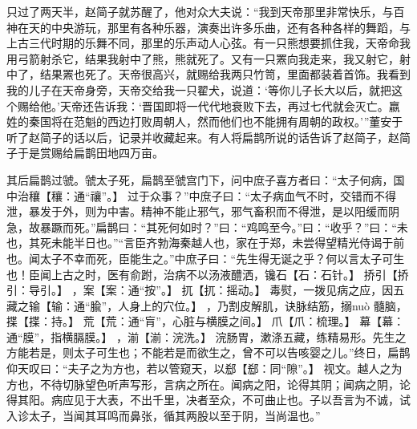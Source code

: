 \documentclass[12pt,UTF8]{ctexbook}
\begin{document}
只过了两天半，赵简子就苏醒了，他对众大夫说：“我到天帝那里非常快乐，与百神在天的中央游玩，那里有各种乐器，演奏出许多乐曲，还有各种各样的舞蹈，与上古三代时期的乐舞不同，那里的乐声动人心弦。有一只熊想要抓住我，天帝命我用弓箭射杀它，结果我射中了熊，熊就死了。又有一只罴向我走来，我又射它，射中了，结果罴也死了。天帝很高兴，就赐给我两只竹笥，里面都装着首饰。我看到我的儿子在天帝身旁，天帝交给我一只翟犬，说道：‘等你儿子长大以后，就把这个赐给他。’天帝还告诉我：‘晋国即将一代代地衰败下去，再过七代就会灭亡。嬴姓的秦国将在范魁的西边打败周朝人，然而他们也不能拥有周朝的政权。’”董安于听了赵简子的话以后，记录并收藏起来。有人将扁鹊所说的话告诉了赵简子，赵简子于是赏赐给扁鹊田地四万亩。

其后扁鹊过虢。虢太子死，扁鹊至虢宫门下，问中庶子喜方者曰：“太子何病，国中治穰【穰：通“禳”。】 过于众事？”中庶子曰：“太子病血气不时，交错而不得泄，暴发于外，则为中害。精神不能止邪气，邪气畜积而不得泄，是以阳缓而阴急，故暴蹶而死。”扁鹊曰：“其死何如时？”曰：“鸡鸣至今。”曰：“收乎？”曰：“未也，其死未能半日也。”“言臣齐勃海秦越人也，家在于郑，未尝得望精光侍谒于前也。闻太子不幸而死，臣能生之。”中庶子曰：“先生得无诞之乎？何以言太子可生也！臣闻上古之时，医有俞跗，治病不以汤液醴洒，镵石【石：石针。】 挢引【挢引：导引。】 ，案【案：通“按”。】 扤【扤：摇动。】 毒熨，一拨见病之应，因五藏之输【输：通“腧”，人身上的穴位。】 ，乃割皮解肌，诀脉结筋，搦nuò 髓脑，揲【揲：持。】 荒【荒：通“肓”，心脏与横膜之间。】 爪【爪：梳理。】 幕【幕：通“膜”，指横膈膜。】 ，湔【湔：浣洗。】 浣肠胃，漱涤五藏，练精易形。先生之方能若是，则太子可生也；不能若是而欲生之，曾不可以告咳婴之儿。”终日，扁鹊仰天叹曰：“夫子之为方也，若以管窥天，以郄【郄：同“隙”。】 视文。越人之为方也，不待切脉望色听声写形，言病之所在。闻病之阳，论得其阴；闻病之阴，论得其阳。病应见于大表，不出千里，决者至众，不可曲止也。子以吾言为不诚，试入诊太子，当闻其耳鸣而鼻张，循其两股以至于阴，当尚温也。”
\end{document}
